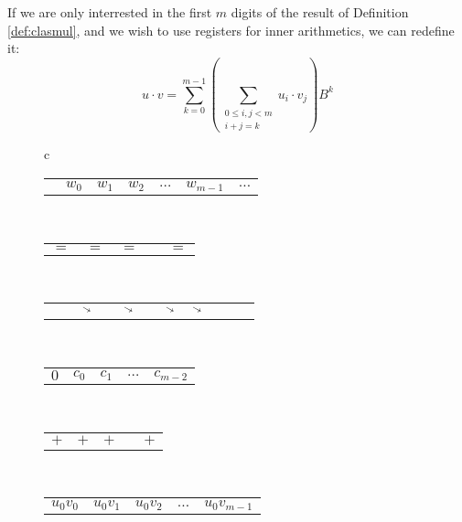 \begin{definition}\label{def:clasmultil}
  If we are only interrested in the first $m$ digits of the result of Definition
  \ref{def:clasmul}, and we wish to use registers for inner arithmetics, we can
  redefine it:
\begin{equation}
\label{eq:clasmul}
u \cdot v = \sum_{k=0}^{m-1} \left( \sum_{\substack{0\leq i,j < m\\i+j=k}}u_i\cdot v_j \right)B^{k}
\end{equation}
\end{definition}

\begin{figure}
  \centering
  \footnotesize
  \begin{tabular}{c}
    \begin{tabular}{C{0cm}|C{0.8cm}|C{0.8cm}|C{0.8cm}|C{0.5cm}|C{0.8cm}|C{0cm}}
      & $w_0$ & $w_1$ & $w_2$ & $\ldots$ & $w_{m-1}$ & $\ldots$\\
    \end{tabular}\\
    \begin{tabular}{C{0.8cm}C{0.8cm}C{0.8cm}C{0.5cm}C{0.8cm}}
      $=$ & $=$ & $=$ &  & $=$
    \end{tabular}\\[-2ex]
    \begin{tabular}{C{0.2cm}C{0.2cm}C{0.2cm}C{0.2cm}C{0.2cm}C{0cm}C{0.7cm}C{0.2cm}C{0.2cm}C{0.2cm}C{0.2cm}}
      & & $\diagonalarrowdown$ & & $\diagonalarrowdown$ & & $\diagonalarrowdown$ & $\diagonalarrowdown$ & &
    \end{tabular}\\[-1.4ex]
    \begin{tabular}{C{0.8cm}C{0.8cm}C{0.8cm}C{0.5cm}C{0.8cm}}
      $0$ & $c_0$ & $c_1$ & $\ldots$ & $c_{m-2}$
    \end{tabular}\\[-0.5ex]
    \begin{tabular}{C{0.8cm}C{0.8cm}C{0.8cm}C{0.5cm}C{0.8cm}}
      $+$ & $+$ & $+$ &  & $+$
    \end{tabular}\\[-0.5ex]
    \begin{tabular}{C{0.8cm}C{0.8cm}C{0.8cm}C{0.5cm}C{0.8cm}}
      $u_0 v_0$ & $u_0 v_1$ & $u_0 v_2$ & $\ldots$ & $u_0v_{m-1}$
    \end{tabular}\\[-0.5ex]
    \begin{tabular}{C{0.8cm}C{0.8cm}C{0.8cm}C{0.5cm}C{0.8cm}}

\end{tabular}
\end{tabular}
\end{figure}
